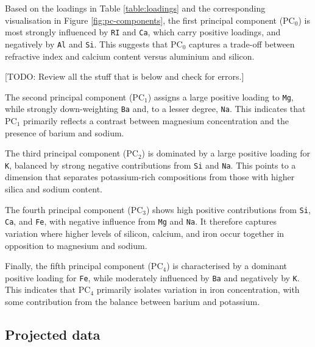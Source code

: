 \documentclass[dtu]{dtuarticle}
\newcommand{\todo}[1]{\color{red}[TODO: #1]\color{black}}
\begin{document}
	Based on the loadings in Table \ref{table:loadings} and the corresponding visualisation in Figure \ref{fig:pc-components}, the first principal component ($\text{PC}_0$) is most strongly influenced by \texttt{RI} and \texttt{Ca}, which carry positive loadings, and negatively by \texttt{Al} and \texttt{Si}. This suggests that $\text{PC}_0$ captures a trade-off between refractive index and calcium content versus aluminium and silicon.


	\todo{Review all the stuff that is below and check for errors.}

	The second principal component ($\text{PC}_1$) assigns a large positive loading to \texttt{Mg}, while strongly down-weighting \texttt{Ba} and, to a lesser degree, \texttt{Na}. This indicates that $\text{PC}_1$ primarily reflects a contrast between magnesium concentration and the presence of barium and sodium.

	The third principal component ($\text{PC}_2$) is dominated by a large positive loading for \texttt{K}, balanced by strong negative contributions from \texttt{Si} and \texttt{Na}. This points to a dimension that separates potassium-rich compositions from those with higher silica and sodium content.

	The fourth principal component ($\text{PC}_3$) shows high positive contributions from \texttt{Si}, \texttt{Ca}, and \texttt{Fe}, with negative influence from \texttt{Mg} and \texttt{Na}. It therefore captures variation where higher levels of silicon, calcium, and iron occur together in opposition to magnesium and sodium.

	Finally, the fifth principal component ($\text{PC}_4$) is characterised by a dominant positive loading for \texttt{Fe}, while moderately influenced by \texttt{Ba} and negatively by \texttt{K}. This indicates that $\text{PC}_4$ primarily isolates variation in iron concentration, with some contribution from the balance between barium and potassium.

	\subsection{Projected data}
\end{document}
